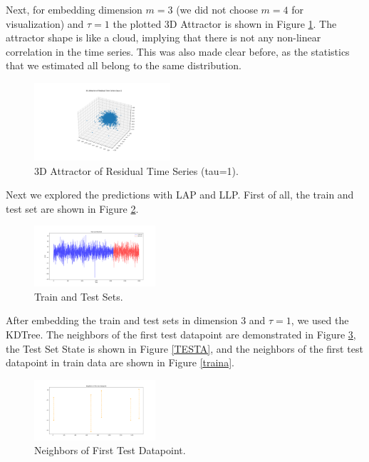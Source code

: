 \documentclass[conference]{IEEEtran}
\begin{document}
Next, for embedding dimension $m = 3$ (we did not choose $m = 4$ for visualization) and $\tau = 1$ the plotted 3D Attractor is shown in Figure \ref{atta}. The attractor shape is like a cloud, implying that there is not any non-linear correlation in the time series. This was also made clear before, as the statistics that we estimated all belong to the same distribution. 

\begin{figure}[ht]
    \centering
    \includegraphics[width=0.45\textwidth]{Figures/AirportNonLin/3D Attractor of Residual Time Series (tau=1).png}
    \caption{3D Attractor of Residual Time Series (tau=1).}
    \label{atta}
\end{figure}

Next we explored the predictions with LAP and LLP. First of all, the train and test set are shown in Figure \ref{tra}.
\vspace{30mm}

\begin{figure}[ht]
    \centering
    \includegraphics[width=0.40\textwidth]{Figures/AirportNonLin/Train and Test Set.png}
    \caption{Train and Test Sets.}
    \label{tra}
\end{figure}

After embedding the train and test sets in dimension 3 and $\tau = 1$, we used the KDTree. The neighbors of the first test datapoint are demonstrated in Figure \ref{ndata}, the Test Set State is shown in Figure \ref{TESTA}, and the neighbors of the first test datapoint in train data are shown in Figure \ref{traina}.

\begin{figure}[ht]
    \centering
    \includegraphics[width=0.40\textwidth]{Figures/AirportNonLin/Neighbors of first test datapoint.png}
    \caption{Neighbors of First Test Datapoint.}
    \label{ndata}
\end{figure}
\end{document}
